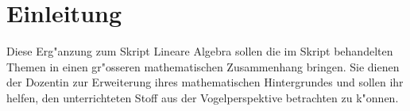 %
%
%
\chapter*{Einleitung}
Diese Erg"anzung zum Skript Lineare Algebra sollen die im Skript
behandelten Themen in einen gr"osseren mathematischen Zusammenhang
bringen.
Sie dienen der Dozentin zur Erweiterung ihres mathematischen
Hintergrundes und sollen ihr helfen, den unterrichteten Stoff 
aus der Vogelperspektive betrachten zu k"onnen.







